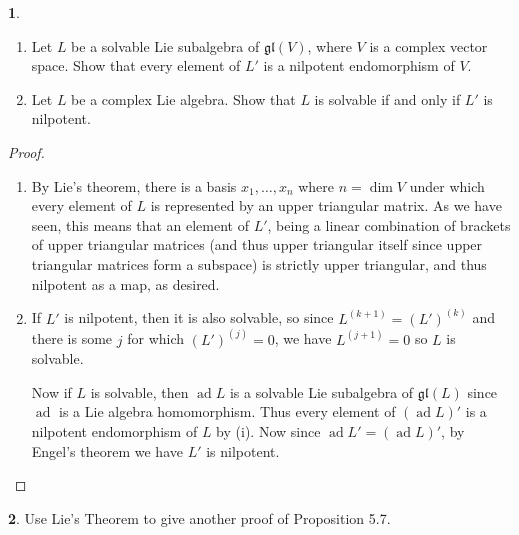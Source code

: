 \documentclass[12pt]{article}
\DeclareMathOperator{\ad}{ad}
\newcommand{\gl}{\mathfrak{gl}}
\theoremstyle{definition}
\newtheorem{ex}{}
\begin{document}
\begin{ex}\
	\begin{enumerate}[label=(\roman*)]
		\item Let $L$ be a solvable Lie subalgebra of $\gl(V)$, where $V$ is a complex vector space.
		      Show that every element of $L'$ is a nilpotent endomorphism of $V$.
		\item Let $L$ be a complex Lie algebra.
		      Show that $L$ is solvable if and only if $L'$ is nilpotent.
	\end{enumerate}
\end{ex}
\begin{proof}\
	\begin{enumerate}[label=(\roman*)]
		\item By Lie's theorem, there is a basis $x_1, \dots, x_n$ where $n = \dim V$ under which every element of $L$ is represented by an upper triangular matrix.
		      As we have seen, this means that an element of $L'$, being a linear combination of brackets of upper triangular matrices (and thus upper triangular itself since upper triangular matrices form a subspace) is strictly upper triangular, and thus nilpotent as a map, as desired.
		\item If $L'$ is nilpotent, then it is also solvable, so since $L^{(k+1)} = (L')^{(k)}$ and there is some $j$ for which $(L')^{(j)} = 0$, we have $L^{(j + 1)} = 0$ so $L$ is solvable.

		      Now if $L$ is solvable, then $\ad L$ is a solvable Lie subalgebra of $\gl(L)$ since $\ad$ is a Lie algebra homomorphism.
		      Thus every element of $(\ad L)'$ is a nilpotent endomorphism of $L$ by (i).
		      Now since $\ad L' = (\ad L)'$, by Engel's theorem we have $L'$ is nilpotent.
	\end{enumerate}
\end{proof}

\begin{ex}
	Use Lie's Theorem to give another proof of Proposition 5.7.
\end{ex}
\end{document}
